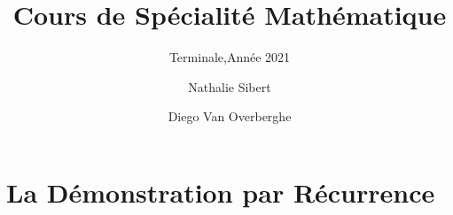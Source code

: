 \documentclass{coursbook}
\begin{document}
    \begin{titlepage}
        \title{Cours de Spécialité Mathématique}
        \subtitle{Terminale,\quad Année 2021}
        \author{Nathalie Sibert\and Diego Van Overberghe}
        \maketitle
    \end{titlepage}
    
    \pagestyle{plain}
    \tableofcontents
    \clearpage
    \pagestyle{scrheadings}
    
    \chapter{La Démonstration par Récurrence}
\end{document}
